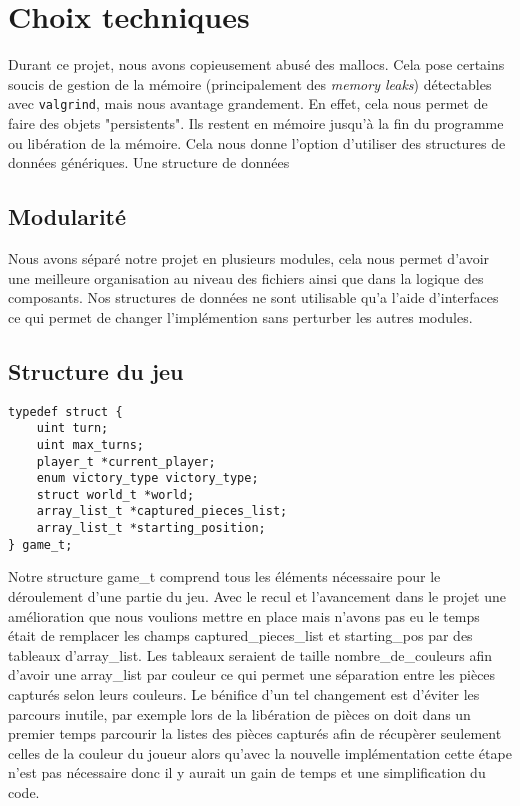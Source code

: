 \section{Choix techniques}
Durant ce projet, nous avons copieusement abusé des mallocs. Cela pose
certains soucis de gestion de la mémoire (principalement des \emph{memory leaks})
détectables avec \verb|valgrind|, mais nous avantage grandement.
En effet, cela nous permet de faire des
objets "persistents". Ils restent en mémoire jusqu'à la fin du programme
ou libération de la mémoire. Cela nous donne l'option d'utiliser des
structures de données génériques. Une structure de données

\subsection{Modularité}
Nous avons séparé notre projet en plusieurs modules, cela nous permet d'avoir une meilleure organisation au niveau des fichiers
ainsi que dans la logique des composants. Nos structures de données ne sont utilisable qu'a l'aide d'interfaces ce qui permet de changer
l'implémention sans perturber les autres modules. 


\subsection{Structure du jeu}

\begin{verbatim}
typedef struct {
    uint turn;
    uint max_turns;
    player_t *current_player;
    enum victory_type victory_type;
    struct world_t *world;
    array_list_t *captured_pieces_list;
    array_list_t *starting_position;
} game_t;
\end{verbatim}


Notre structure game\_t comprend tous les éléments nécessaire pour le déroulement
d'une partie du jeu.
Avec le recul et l'avancement dans le projet une amélioration que nous voulions mettre en place mais n'avons
pas eu le temps était de remplacer les champs captured\_pieces\_list et starting\_pos par des tableaux d'array\_list.
Les tableaux seraient de taille nombre\_de\_couleurs afin d'avoir une array\_list par couleur ce qui permet
une séparation entre les pièces capturés selon leurs couleurs. Le bénifice d'un tel changement est 
d'éviter les parcours inutile, par exemple lors de la libération de pièces on doit dans un premier temps
parcourir la listes des pièces capturés afin de récupèrer seulement celles de la couleur du joueur alors
qu'avec la nouvelle implémentation cette étape n'est pas nécessaire donc il y aurait un gain de temps et
une simplification du code.  


